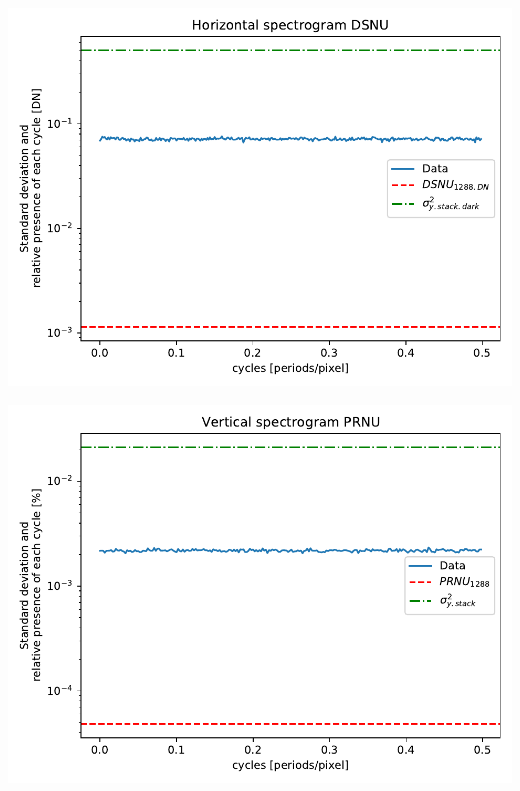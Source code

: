 \documentclass[a4paper,twoside,12pt,american,hidelinks]{article}
\begin{document}
\begin{center}
\includegraphics[height=0.45\textheight,keepaspectratio]{OP1/PlotHorizontalSpectrogramDSNU.pdf}
\end{center}
\vfill
\newpage
\begin{center}
\includegraphics[height=0.45\textheight,keepaspectratio]{OP1/PlotVerticalSpectrogramPRNU.pdf}
\end{center}
\end{document}
